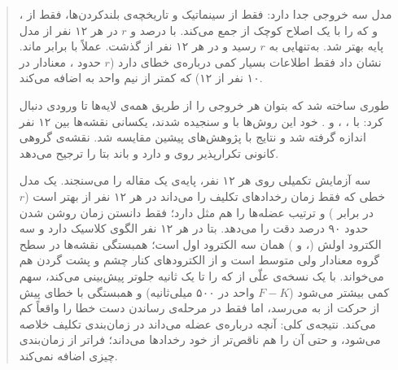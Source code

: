 \documentclass[11pt,a4paper]{article}
\begin{document}
\begin{abstract}
مدل  سه خروجی جدا دارد:  فقط از سینماتیک و تاریخچه‌ی بلندکردن‌ها،  فقط از ، و  که  را با یک اصلاح کوچک از  جمع می‌کند.  با   درصد و $r$  در هر ۱۲ نفر از مدل پایه بهتر شد.  به‌تنهایی به $r$  رسید و در هر ۱۲ نفر از  گذشت.  عملاً با  برابر ماند.  نشان داد  فقط اطلاعات بسیار کمی درباره‌ی خطای  دارد ($r$ حدود ، معنادار در ۱۰ نفر از ۱۲) که کمتر از نیم واحد به  اضافه می‌کند.

 طوری ساخته شد که بتوان هر خروجی را از طریق همه‌ی لایه‌ها تا ورودی دنبال کرد: با ، ،  و . خود این روش‌ها با  و  سنجیده شدند، یکسانی نقشه‌ها بین ۱۲ نفر اندازه گرفته شد و نتایج با پژوهش‌های پیشین مقایسه شد. نقشه‌ی گروهی  کانونی تکرارپذیر روی  و  دارد و باند بتا را ترجیح می‌دهد.

سه آزمایش تکمیلی روی هر ۱۲ نفر، پایه‌ی یک مقاله را می‌سنجند. یک مدل خطی که فقط زمان رخدادهای تکلیف را می‌داند در هر ۱۲ نفر از  بهتر است ($r$  در برابر ) و ترتیب عضله‌ها را هم مثل  دارد؛ فقط دانستن زمان روشن شدن  حدود ۹۰ درصد دقت  را می‌دهد.  بتا در هر ۱۲ نفر الگوی کلاسیک دارد و سه الکترود اولش (،  و ) همان سه الکترود اول  است؛ همبستگی نقشه‌ها در سطح گروه معنادار ولی متوسط است و  از الکترودهای کنار چشم و پشت گردن هم می‌خواند. با یک نسخه‌ی علّی از  که  را تا یک ثانیه جلوتر پیش‌بینی می‌کند، سهم  کمی بیشتر می‌شود ($F-K$  واحد  در ۵۰۰ میلی‌ثانیه) و همبستگی  با خطای  پیش از حرکت از  به  می‌رسد، اما فقط در مرحله‌ی رساندن دست خطا را واقعاً کم می‌کند. نتیجه‌ی کلی: آنچه  درباره‌ی عضله می‌داند در زمان‌بندی تکلیف خلاصه می‌شود، و حتی آن را هم ناقص‌تر از خود رخدادها می‌داند؛ فراتر از زمان‌بندی چیزی اضافه نمی‌کند.
\end{abstract}

\tableofcontents
\newpage
















\end{document}
